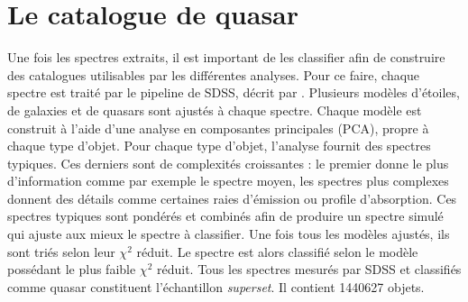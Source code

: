 \section{Le catalogue de quasar}
Une fois les spectres extraits, il est important de les classifier afin de construire des catalogues utilisables par les différentes analyses. Pour ce faire, chaque spectre est traité par le pipeline de SDSS, décrit par \textcite{Bolton2012}.
Plusieurs modèles d'étoiles, de galaxies et de quasars sont ajustés à chaque spectre.
Chaque modèle est construit à l'aide d'une analyse en composantes principales (PCA), propre à chaque type d'objet. Pour chaque type d'objet, l'analyse fournit des spectres typiques. Ces derniers sont de complexités croissantes : le premier donne le plus d'information comme par exemple le spectre moyen, les spectres plus complexes donnent des détails comme certaines raies d'émission ou profile d'absorption. Ces spectres typiques sont pondérés et combinés afin de produire un spectre simulé qui ajuste aux mieux le spectre à classifier.
Une fois tous les modèles ajustés, ils sont triés selon leur $\chi^{2}$ réduit. Le spectre est alors classifié selon le modèle possédant le plus faible $\chi^{2}$ réduit.
Tous les spectres mesurés par SDSS et classifiés comme quasar constituent l'échantillon \emph{superset}. Il contient \num{1440627} objets.

